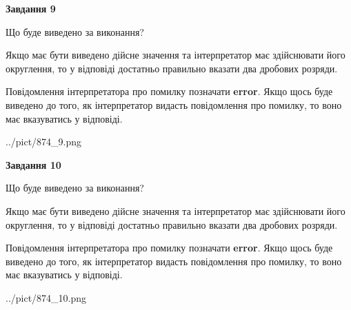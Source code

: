 \documentclass[12pt, ukrainian]{article}
\begin{document}
{\begin {Large}
{\begin {center}\textbf{Завдання 9}\end {center}}\par
Що буде виведено за виконання? \par

Якщо має бути виведено дійсне значення та інтерпретатор має здійснювати його округлення, 
то у відповіді достатньо правильно вказати два дробових розряди.

Повідомлення інтерпретатора про помилку позначати \textbf{error}.
Якщо щось буде виведено до того, як інтерпретатор видасть повідомлення про помилку, 
то воно має вказуватись у відповіді. \par

\begin{center}
	{../pict/874_9.png}
\end{center}
\newpage

{\begin {center}\textbf{Завдання 10}\end {center}}\par
Що буде виведено за виконання? \par

Якщо має бути виведено дійсне значення та інтерпретатор має здійснювати його округлення, 
то у відповіді достатньо правильно вказати два дробових розряди.

Повідомлення інтерпретатора про помилку позначати \textbf{error}.
Якщо щось буде виведено до того, як інтерпретатор видасть повідомлення про помилку, 
то воно має вказуватись у відповіді. \par

\begin{center}
	{../pict/874_10.png}
\end{center}
\newpage

\end {Large}}
\end{document}
